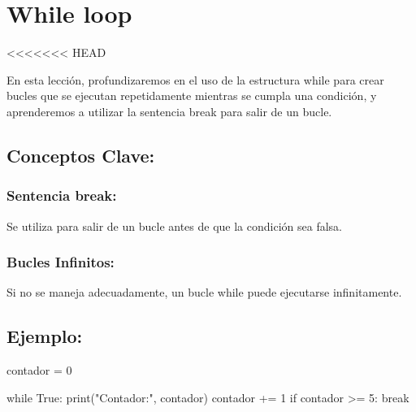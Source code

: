 \documentclass[
  a4paper,
  DIV=11,
  numbers=noendperiod,
  onepage,
  openany]{scrreprt}
\newenvironment{Shaded}{\begin{snugshade}}{\end{snugshade}}
\newcommand{\BuiltInTok}[1]{\textcolor[rgb]{0.00,0.23,0.31}{#1}}
\newcommand{\ControlFlowTok}[1]{\textcolor[rgb]{0.00,0.23,0.31}{#1}}
\newcommand{\DecValTok}[1]{\textcolor[rgb]{0.68,0.00,0.00}{#1}}
\newcommand{\NormalTok}[1]{\textcolor[rgb]{0.00,0.23,0.31}{#1}}
\newcommand{\OperatorTok}[1]{\textcolor[rgb]{0.37,0.37,0.37}{#1}}
\newcommand{\StringTok}[1]{\textcolor[rgb]{0.13,0.47,0.30}{#1}}
\newcommand{\VariableTok}[1]{\textcolor[rgb]{0.07,0.07,0.07}{#1}}
\begin{document}
\hypertarget{while-loop}{%
\chapter{While loop}\label{while-loop}}

\textless\textless\textless\textless\textless\textless\textless{} HEAD

En esta lección, profundizaremos en el uso de la estructura while para
crear bucles que se ejecutan repetidamente mientras se cumpla una
condición, y aprenderemos a utilizar la sentencia break para salir de un
bucle.

\hypertarget{conceptos-clave-38}{%
\section{Conceptos Clave:}\label{conceptos-clave-38}}

\hypertarget{sentencia-break}{%
\subsection{Sentencia break:}\label{sentencia-break}}

Se utiliza para salir de un bucle antes de que la condición sea falsa.

\hypertarget{bucles-infinitos}{%
\subsection{Bucles Infinitos:}\label{bucles-infinitos}}

Si no se maneja adecuadamente, un bucle while puede ejecutarse
infinitamente.

\hypertarget{ejemplo-38}{%
\section{Ejemplo:}\label{ejemplo-38}}

\begin{Shaded}
\begin{Highlighting}[]
\NormalTok{contador }\OperatorTok{=} \DecValTok{0}

\ControlFlowTok{while} \VariableTok{True}\NormalTok{:}
    \BuiltInTok{print}\NormalTok{(}\StringTok{"Contador:"}\NormalTok{, contador)}
\NormalTok{    contador }\OperatorTok{+=} \DecValTok{1}
    \ControlFlowTok{if}\NormalTok{ contador }\OperatorTok{\textgreater{}=} \DecValTok{5}\NormalTok{:}
        \ControlFlowTok{break}
\end{Highlighting}
\end{Shaded}
\end{document}
